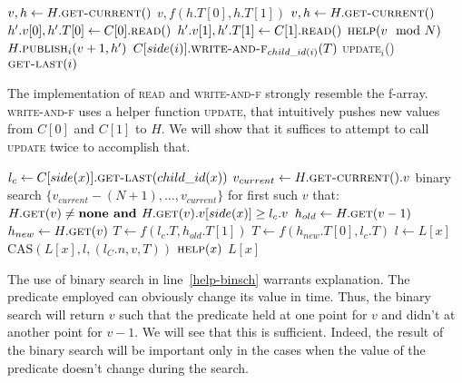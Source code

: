 \documentclass[a4paper,11pt]{article}
\def\none{\textbf{none} }
\newcommand{\fn}[1]{\textsc{#1}}
\begin{document}
\begin{algorithmic}[1]
		\State $v, h \gets H.\fn{get-current}()$ \label{get-getownver}
		\State \Return $v, f(h.T[0], h.T[1])$
	\EndFunction
		\State $v, h \gets H.\fn{get-current}()$ \label{upd-getown}
		\State $h'.v[0], h'.T[0] \gets C[0].\fn{read}()$ \label{upd-getch-0}
		\State $h'.v[1], h'.T[1] \gets C[1].\fn{read}()$ \label{upd-getch-1}
		\State $\fn{help}(v \mod N)$
		\State \Return $H.\fn{publish$_i$}(v+1, h')$ \label{upd-publish}
	\EndFunction
		\State $C[side(i)].\fn{write-and-f$_{child\_id(i)}$}(T)$ \label{upd-chupd}
		\If{\textbf{not} \fn{update$_i$}()} \label{updcall1}
		\State \fn{update$_i$}() \label{updcall2}
		\EndIf
		\State \Return $\fn{get-last}(i)$
	\EndFunction
\end{algorithmic}

The implementation of \fn{read} and \fn{write-and-f} strongly resemble the f-array. \fn{write-and-f} uses a helper function \fn{update}, that intuitively pushes new values from $C[0]$ and $C[1]$ to $H$.
We will show that it suffices to attempt to call \fn{update} twice to accomplish that.

\begin{algorithmic}[1]
		\State $l_c \gets C[side(x)].\fn{get-last}(child\_id(x))$ \label{get-last-recurse}
		\State $v_{current} \gets H.\fn{get-current}().v$
		\State binary search $\{v_{current}-(N+1),\ldots, v_{current}\}$ for first such $v$ that: \label{help-binsch}
		\Statex $H.\fn{get}(v) \neq \none \textbf{ and } H.\fn{get}(v).v[side(x)] \geq l_c.v$ %
			\State \Return
		\EndIf
		\State $h_{old} \gets H.\fn{get}(v-1)$ \label{help-getprev}
		\State $h_{new} \gets H.\fn{get}(v)$
		\If{$h_{old} = \none \textbf{ or } h_{new} = \none$}
			\State \Return
		\EndIf
		\State $T \gets f(l_c.T, h_{old}.T[1])$
		\Else
		\State $T \gets f(h_{new}.T[0], l_c.T)$
		\EndIf
		\State $l \gets L[x]$
		 \label{upd-last-alreadydone}
			\State $\text{CAS}(L[x], l, (l_C.n, v, T))$
		\EndIf
	\EndFunction
		\State $\fn{help}(x)$
		\State \Return $L[x]$
	\EndFunction
\end{algorithmic}

The use of binary search in line~\ref{help-binsch} warrants explanation. The predicate employed can obviously change its value in time. Thus, the binary search will return $v$ such that the predicate held at one point
for $v$ and didn't at another point for $v-1$. We will see that this is sufficient. Indeed, the result of the binary search will be important only in the cases when the value of the predicate doesn't change during
the search.
\end{document}
